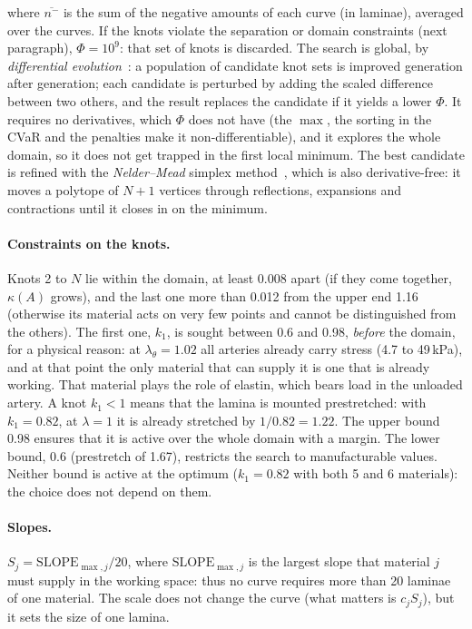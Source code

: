 where $\overline{n^{-}}$ is the sum of the negative amounts of each curve (in laminae), averaged over the curves. If the knots violate the separation or domain constraints (next paragraph), $\Phi=10^{9}$: that set of knots is discarded.
The search is global, by \emph{differential evolution}~\cite{storn}: a population of candidate knot sets is improved generation after generation; each candidate is perturbed by adding the scaled difference between two others, and the result replaces the candidate if it yields a lower $\Phi$. It requires no derivatives, which $\Phi$ does not have (the $\max$, the sorting in the CVaR and the penalties make it non-differentiable), and it explores the whole domain, so it does not get trapped in the first local minimum. The best candidate is refined with the \emph{Nelder--Mead} simplex method~\cite{nelder}, which is also derivative-free: it moves a polytope of $N+1$ vertices through reflections, expansions and contractions until it closes in on the minimum.

\paragraph{Constraints on the knots.} Knots 2 to $N$ lie within the domain, at least 0.008 apart (if they come together, $\kappa(A)$ grows), and the last one more than 0.012 from the upper end 1.16 (otherwise its material acts on very few points and cannot be distinguished from the others). The first one, $k_1$, is sought between 0.6 and 0.98, \emph{before} the domain, for a physical reason: at $\lambda_\theta=1.02$ all arteries already carry stress (4.7 to 49\,kPa), and at that point the only material that can supply it is one that is already working. That material plays the role of elastin, which bears load in the unloaded artery. A knot $k_1<1$ means that the lamina is mounted prestretched: with $k_1=0.82$, at $\lambda=1$ it is already stretched by $1/0.82=1.22$. The upper bound 0.98 ensures that it is active over the whole domain with a margin. The lower bound, 0.6 (prestretch of 1.67), restricts the search to manufacturable values. Neither bound is active at the optimum ($k_1=0.82$ with both 5 and 6 materials): the choice does not depend on them.

\paragraph{Slopes.} $S_j=\mathrm{SLOPE}_{\max,j}/20$, where $\mathrm{SLOPE}_{\max,j}$ is the largest slope that material $j$ must supply in the working space: thus no curve requires more than 20 laminae of one material. The scale does not change the curve (what matters is $c_jS_j$), but it sets the size of one lamina.

